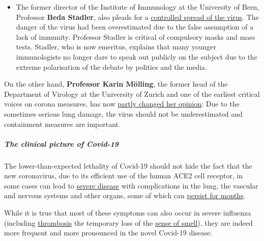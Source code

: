\begin{itemize}
{  natural immunization''} of society as an alternative to the
  ``eradication strategy''. In most cases, Covid-19 is mild and the
  actual mortality rate is about 0.1\%, which is in the range of a
  severe influenza. The Swedes ``did nothing wrong'' with their
  strategy, according to Vernazza.
\item
  The former director of the Institute of Immunology at the University
  of Bern, Professor \textbf{Beda Stadler}, also pleads for a
  \href{https://www.youtube.com/watch?v=GBRcK-od50Q}{controlled spread
  of the virus}. The danger of the virus had been overestimated due to
  the false assumption of a lack of immunity. Professor Stadler is
  critical of compulsory masks and mass tests. Stadler, who is now
  emeritus, explains that many younger immunologists no longer dare to
  speak out publicly on the subject due to the extreme polarisation of
  the debate by politics and the media.
\end{itemize}

On the other hand, \textbf{Professor Karin Mölling}, the former head of
the Department of Virology at the University of Zurich and one of the
earliest critical voices on corona measures, has now
\href{https://www.bazonline.ch/eine-zweite-welle-laesst-sich-vermeiden-zumindest-bis-im-winter-959708338566}{partly
changed her opinion}: Due to the sometimes serious lung damage, the
virus should not be underestimated and containment measures are
important.

\hypertarget{the-clinical-picture-of-covid-19}{%
\subparagraph{\texorpdfstring{\textbf{The clinical picture of
Covid-19}}{The clinical picture of Covid-19}}\label{the-clinical-picture-of-covid-19}}

The lower-than-expected lethality of Covid-19 should not hide the fact
that the new coronavirus, due to its efficient use of the human ACE2
cell receptor, in some cases can lead to
\href{https://www.nature.com/articles/s41591-020-0968-3}{severe disease}
with complications in the lung, the vascular and nervous systems and
other organs, some of which can
\href{https://jamanetwork.com/journals/jama/fullarticle/2768351}{persist
for months}.

While it is true that most of these symptoms can also occur in severe
influenza (including
\href{https://www.sciencedaily.com/releases/2009/10/091014111549.htm}{thrombosis}
the temporary loss of the
\href{https://pubmed.ncbi.nlm.nih.gov/23948436/}{sense of smell}), they
are indeed more frequent and more pronounced in the novel Covid-19
disease.

